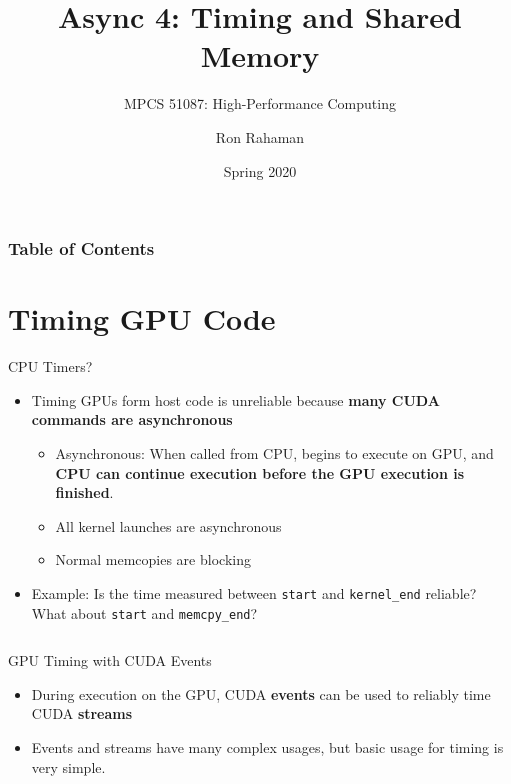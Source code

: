 \documentclass{beamer}
\title{Async 4: Timing and Shared Memory}
\subtitle{MPCS 51087: High-Performance Computing}
\date{Spring 2020}
\author{Ron Rahaman}
\institute{The University of Chicago, Dept of Computer Science}
\begin{document}
    \maketitle

    \begin{frame}
        \frametitle{Table of Contents}
        \tableofcontents[]
    \end{frame}

    \section{Timing GPU Code}

    \begin{frame}{CPU Timers?}

        \begin{itemize}
            \item Timing GPUs form host code is unreliable because \textbf{many CUDA commands are asynchronous}
            \begin{itemize}
                \item Asynchronous: When called from CPU, begins to execute on GPU, and \textbf{CPU can continue execution before the GPU execution is finished}.
                \item All kernel launches are asynchronous
                \item Normal memcopies are blocking
            \end{itemize}
            \item Example:  Is the time measured between \texttt{start} and \texttt{kernel\_end} reliable?  What about \texttt{start} and \texttt{memcpy\_end}?
        \end{itemize}

        \begin{block}{}
            \inputminted{cuda}{src/cpu-timer.cu}
        \end{block}

    \end{frame}

    \begin{frame}{GPU Timing with CUDA Events}
        \begin{itemize}
            \item During execution on the GPU, CUDA \textbf{events} can be used to reliably time CUDA \textbf{streams}
            \item Events and streams have many complex usages, but basic usage for timing is very simple.
        \end{itemize}
    \end{frame}
\end{document}
